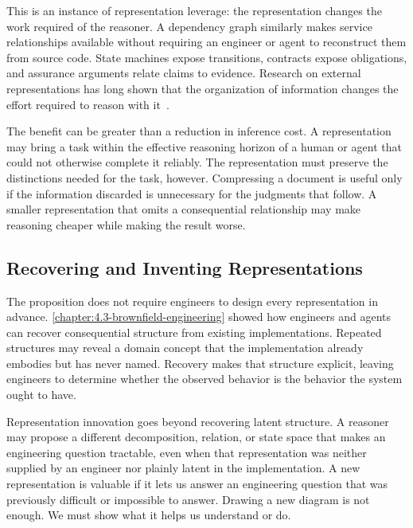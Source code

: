 This is an instance of representation leverage: the representation changes the work required of the reasoner. A dependency graph similarly makes service relationships available without requiring an engineer or agent to reconstruct them from source code. State machines expose transitions, contracts expose obligations, and assurance arguments relate claims to evidence. Research on external representations has long shown that the organization of information changes the effort required to reason with it~\citep{larkin1987diagram, zhang1994representations}.


The benefit can be greater than a reduction in inference cost. A representation may bring a task within the effective reasoning horizon of a human or agent that could not otherwise complete it reliably. The representation must preserve the distinctions needed for the task, however. Compressing a document is useful only if the information discarded is unnecessary for the judgments that follow. A smaller representation that omits a consequential relationship may make reasoning cheaper while making the result worse.

\subsection{Recovering and Inventing Representations}\label{heading:recovering-and-inventing-representations}


The proposition does not require engineers to design every representation in advance. \cref{chapter:4.3-brownfield-engineering} showed how engineers and agents can recover consequential structure from existing implementations. Repeated structures may reveal a domain concept that the implementation already embodies but has never named. Recovery makes that structure explicit, leaving engineers to determine whether the observed behavior is the behavior the system ought to have.

Representation innovation goes beyond recovering latent structure. A reasoner may propose a different decomposition, relation, or state space that makes an engineering question tractable, even when that representation was neither supplied by an engineer nor plainly latent in the implementation. A new representation is valuable if it lets us answer an engineering question that was previously difficult or impossible to answer. Drawing a new diagram is not enough. We must show what it helps us understand or do.

